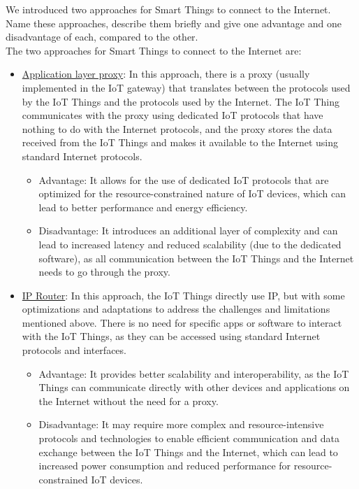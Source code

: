 \begin{ejercicio}
    We introduced two approaches for Smart Things to connect to the Internet. Name these approaches, describe them briefly and give one advantage and one disadvantage of each, compared to the other.\\

    The two approaches for Smart Things to connect to the Internet are:
    \begin{itemize}
        \item \ul{Application layer proxy}: In this approach, there is a proxy (usually implemented in the IoT gateway) that translates between the protocols used by the IoT Things and the protocols used by the Internet. The IoT Thing communicates with the proxy using dedicated IoT protocols that have nothing to do with the Internet protocols, and the proxy stores the data received from the IoT Things and makes it available to the Internet using standard Internet protocols.
        \begin{itemize}
            \item Advantage: It allows for the use of dedicated IoT protocols that are optimized for the resource-constrained nature of IoT devices, which can lead to better performance and energy efficiency.
            \item Disadvantage: It introduces an additional layer of complexity and can lead to increased latency and reduced scalability (due to the dedicated software), as all communication between the IoT Things and the Internet needs to go through the proxy.
        \end{itemize}

        \item \ul{IP Router}: In this approach, the IoT Things directly use IP, but with some optimizations and adaptations to address the challenges and limitations mentioned above. There is no need for specific apps or software to interact with the IoT Things, as they can be accessed using standard Internet protocols and interfaces.
        \begin{itemize}
            \item Advantage: It provides better scalability and interoperability, as the IoT Things can communicate directly with other devices and applications on the Internet without the need for a proxy.
            \item Disadvantage: It may require more complex and resource-intensive protocols and technologies to enable efficient communication and data exchange between the IoT Things and the Internet, which can lead to increased power consumption and reduced performance for resource-constrained IoT devices.
        \end{itemize}
    \end{itemize}
\end{ejercicio}

